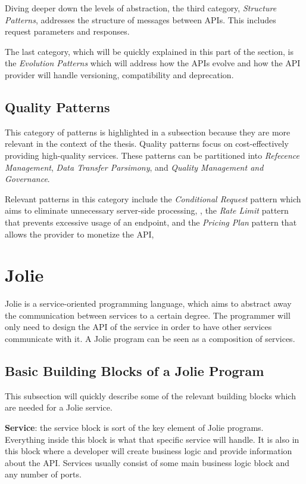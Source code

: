 Diving deeper down the levels of abstraction, the third category, \textit{Structure Patterns}, addresses the structure of messages between APIs. This includes request parameters and responses.

The last category, which will be quickly explained in this part of the section, is the \textit{Evolution Patterns} which will address how the APIs evolve and how the API provider will handle versioning, compatibility and deprecation.

\subsection{Quality Patterns}
This category of patterns is highlighted in a subsection because they are more relevant in the context of the thesis. 
Quality patterns focus on cost-effectively providing high-quality services. These patterns can be partitioned into \textit{Refecence Management}, \textit{Data Transfer Parsimony}, and \textit{Quality Management and Governance}.

Relevant patterns in this category include the \textit{Conditional Request} pattern which aims to eliminate unnecessary server-side processing,
, the \textit{Rate Limit} pattern that prevents excessive usage of an endpoint, and the \textit{Pricing Plan} pattern that allows the provider to monetize the API,


\section{Jolie}
Jolie is a service-oriented programming language, which aims to abstract away the communication between services to a certain degree.
The programmer will only need to design the API of the service in order to have other services communicate with it.
A Jolie program can be seen as a composition of services.

\subsection{Basic Building Blocks of a Jolie Program}
This subsection will quickly describe some of the relevant building blocks which are needed for a Jolie service.

\textbf{Service}: the service block is sort of the key element of Jolie programs. Everything inside this block is what that specific service will handle. It is also 
in this block where a developer will create business logic and provide information about the API. Services usually consist of some main business logic block and any number of ports.

